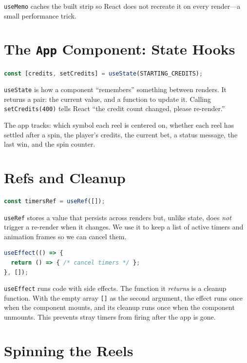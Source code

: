 \documentclass[11pt]{article}
\begin{document}
\texttt{useMemo} caches the built strip so React does not recreate it on
every render---a small performance trick.

\section{The \texttt{App} Component: State Hooks}

\begin{lstlisting}[language=JavaScript]
const [credits, setCredits] = useState(STARTING_CREDITS);
\end{lstlisting}

\texttt{useState} is how a component ``remembers'' something between renders.
It returns a pair: the current value, and a function to update it.
Calling \texttt{setCredits(400)} tells React ``the credit count changed, please re-render.''

The app tracks: which symbol each reel is centered on, whether each reel has
settled after a spin, the player's credits, the current bet, a status message,
the last win, and the spin counter.

\section{Refs and Cleanup}

\begin{lstlisting}[language=JavaScript]
const timersRef = useRef([]);
\end{lstlisting}

\texttt{useRef} stores a value that persists across renders but, unlike state,
does \emph{not} trigger a re-render when it changes. We use it to keep
a list of active timers and animation frames so we can cancel them.

\begin{lstlisting}[language=JavaScript]
useEffect(() => {
  return () => { /* cancel timers */ };
}, []);
\end{lstlisting}

\texttt{useEffect} runs code with side effects. The function it \emph{returns}
is a cleanup function. With the empty array \texttt{[]} as the second argument,
the effect runs once when the component mounts, and its cleanup runs once
when the component unmounts. This prevents stray timers from firing after
the app is gone.

\section{Spinning the Reels}
\end{document}
